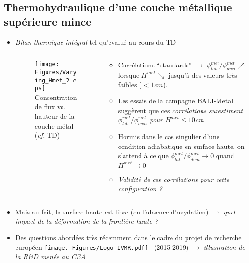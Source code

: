 \subsection{Thermohydraulique d'une couche métallique supérieure mince}
\begin{frame}[fragile]
\begin{itemize}
\item \emph{Bilan thermique intégral} tel qu'evalué au cours du TD
\begin{columns}[T]
    \begin{column}{0.25\textwidth}
\begin{figure}[H]
\centering \texttt{[image: Figures/Varying\_Hmet\_2.eps]} \\
{\tiny Concentration de flux vs. hauteur de la couche métal (\textit{cf.} TD)}
\end{figure}
    \end{column}
    \begin{column}{0.75\textwidth}
\begin{itemize}
\item Corrélations ``standards'' $\rightarrow$ $\phi^{met}_{lat}/\phi^{met}_{dwn} \nearrow$ lorsque $H^{met} \searrow$ jusqu'à des valeurs très faibles ($<1cm$).
\item Les essais de la campagne BALI-Metal suggèrent que ces \emph{corrélations surestiment $\phi^{met}_{lat}/\phi^{met}_{dwn}$ pour $H^{met} \le 10$cm}
\item Hormis dans le cas singulier d'une condition adiabatique en surface haute, on s'attend à ce que $\phi^{met}_{lat}/\phi^{met}_{dwn} \rightarrow 0$ quand $H^{met} \rightarrow 0$
\item \emph{Validité de ces corrélations pour cette configuration ?}
\end{itemize}
    \end{column}
\end{columns}
\item Mais au fait, la surface haute est libre (en l'absence d'oxydation) $\rightarrow$ \emph{quel impact de la déformation de la frontière haute ?}
\item Des questions abordées très récemment dans le cadre du projet de recherche européen \texttt{[image: Figures/Logo\_IVMR.pdf]} ~(2015-2019) $\rightarrow$ \emph{illustration de la R\&D menée au CEA}
\end{itemize}
\end{frame}
